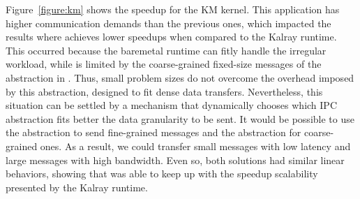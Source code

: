 	Figure~\ref{figure:km} shows the speedup for the KM kernel.
	This application has higher communication demands than the
	previous ones, which impacted the results where \lwmpi achieves lower
	speedups when compared to the Kalray runtime.
	This occurred because the baremetal
	runtime can fitly handle the irregular workload, while \lwmpi is
	limited by the coarse-grained fixed-size messages of the
	\portal abstraction in \nanvix.
	Thus, small problem sizes do not overcome the overhead imposed by
	this abstraction, designed to fit dense data transfers.
	Nevertheless, this situation can be settled by a mechanism that dynamically
	chooses which IPC abstraction fits better the data
	granularity to be sent. It would be possible to use the \mailbox
	abstraction to send fine-grained messages and the \portal abstraction for coarse-grained
	ones. As a result, we could transfer small messages with low latency and large messages
	with high bandwidth.
	Even so, both solutions had similar linear behaviors, showing that
	\lwmpi was able to keep up with the speedup scalability presented by
	the Kalray runtime.
